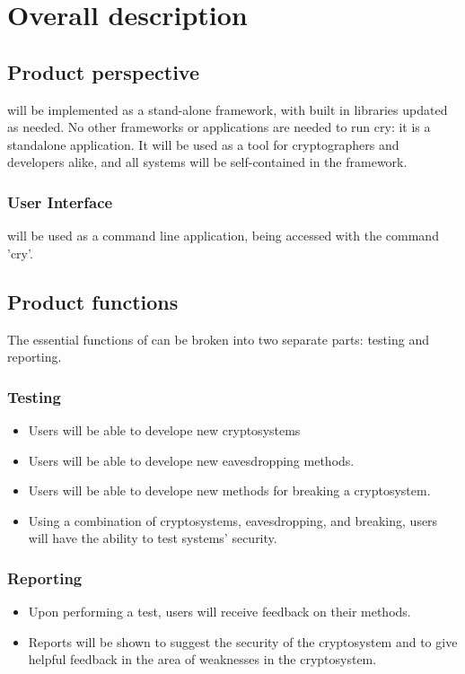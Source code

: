 \section{Overall description}
\dd


\subsection{Product perspective}

\cry{} will be implemented as a stand-alone framework, with built in libraries updated as needed. No other frameworks
or applications are needed to run cry: it is a standalone application. It will be used as a tool for cryptographers and
developers alike, and all systems will be self-contained in the framework.
  \subsubsection{User Interface}

  \cry{} will be used as a command line application, being accessed with the command 'cry'.


\subsection{Product functions}

The essential functions of \cry{} can be broken into two separate parts: testing and reporting.
  \subsubsection{Testing}
  \begin{itemize}
    \item Users will be able to develope new cryptosystems
    \item Users will be able to develope new eavesdropping methods.
    \item Users will be able to develope new methods for breaking a cryptosystem.
    \item Using a combination of cryptosystems, eavesdropping, and breaking, users will have the ability
    to test systems' security.
  \end{itemize}
  \subsubsection{Reporting}
  \begin{itemize}
    \item Upon performing a test, users will receive feedback on their methods.
    \item Reports will be shown to suggest the security of the cryptosystem and to give helpful feedback
    in the area of weaknesses in the cryptosystem.
  \end{itemize}

